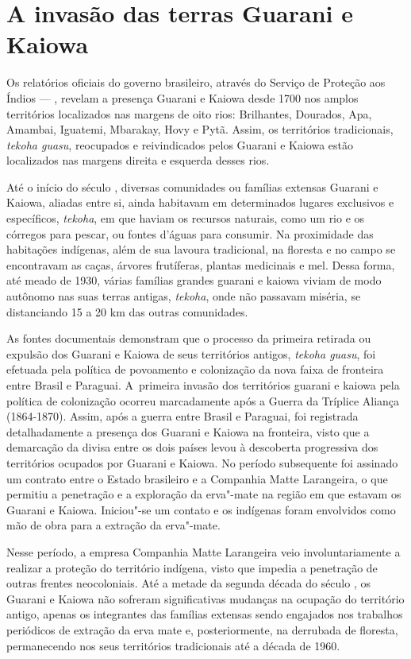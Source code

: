 \section{A invasão das terras Guarani e Kaiowa}

Os relatórios oficiais do governo brasileiro, através do Serviço de
Proteção aos Índios --- , revelam a presença Guarani e Kaiowa desde
1700 nos amplos territórios localizados nas margens de oito rios:
Brilhantes, Dourados, Apa, Amambai, Iguatemi, Mbarakay, Hovy e Pytã.
Assim, os territórios tradicionais, \emph{tekoha guasu}, reocupados e
reivindicados pelos Guarani e Kaiowa estão localizados nas margens
direita e esquerda desses rios.

Até o início do século , diversas comunidades ou famílias extensas
Guarani e Kaiowa, aliadas entre si, ainda habitavam em determinados
lugares exclusivos e específicos, \emph{tekoha}, em que haviam os recursos
naturais, como um rio e os córregos para pescar, ou fontes d’águas para
consumir. Na proximidade das habitações indígenas, além de sua lavoura
tradicional, na floresta e no campo se encontravam as caças, árvores
frutíferas, plantas medicinais e mel. Dessa forma, até meado de 1930,
várias famílias grandes guarani e kaiowa viviam de modo autônomo nas
suas terras antigas, \emph{tekoha}, onde não passavam miséria, se distanciando
15 a 20 km das outras comunidades.

As fontes documentais demonstram que o processo da primeira retirada ou
expulsão dos Guarani e Kaiowa de seus territórios antigos, \emph{tekoha
guasu}, foi efetuada pela política de povoamento e colonização da nova
faixa de fronteira entre Brasil e Paraguai. A~primeira invasão dos
territórios guarani e kaiowa pela política de colonização ocorreu
marcadamente após a Guerra da Tríplice Aliança (1864-1870). Assim, após
a guerra entre Brasil e Paraguai, foi registrada detalhadamente a
presença dos Guarani e Kaiowa na fronteira, visto que a demarcação da
divisa entre os dois países levou à descoberta progressiva dos
territórios ocupados por Guarani e Kaiowa. No período subsequente foi
assinado um contrato entre o Estado brasileiro e a Companhia Matte
Larangeira, o que permitiu a penetração e a exploração da erva"-mate na
região em que estavam os Guarani e Kaiowa. Iniciou"-se um contato e os
indígenas foram envolvidos como mão de obra para a extração da
erva"-mate.

Nesse período, a empresa Companhia Matte Larangeira veio
involuntariamente a realizar a proteção do território indígena, visto
que impedia a penetração de outras frentes neocoloniais. Até a metade
da segunda década do século , os Guarani e Kaiowa não sofreram
significativas mudanças na ocupação do território antigo, apenas os
integrantes das famílias extensas sendo engajados nos trabalhos
periódicos de extração da erva mate e, posteriormente, na derrubada de
floresta, permanecendo nos seus territórios tradicionais até a década
de 1960.

